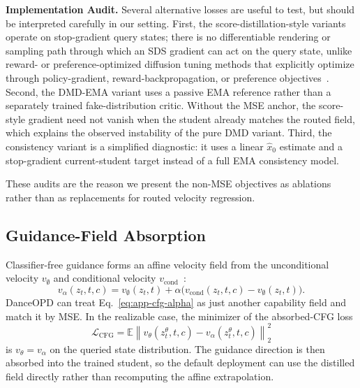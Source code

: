 \documentclass{llmxive}
\begin{document}
\noindent\textbf{Implementation Audit.}
Several alternative losses are useful to test, but should be interpreted carefully in our setting. First, the score-distillation-style variants operate on stop-gradient query states; there is no differentiable rendering or sampling path through which an SDS gradient can act on the query state, unlike reward- or preference-optimized diffusion tuning methods that explicitly optimize through policy-gradient, reward-backpropagation, or preference objectives~\cite{black2024training,fan2023dpok,prabhudesai2023aligning,wallace2024diffusion}. Second, the DMD-EMA variant uses a passive EMA reference rather than a separately trained fake-distribution critic. Without the MSE anchor, the score-style gradient need not vanish when the student already matches the routed field, which explains the observed instability of the pure DMD variant. Third, the consistency variant is a simplified diagnostic: it uses a linear $\hat{x}_0$ estimate and a stop-gradient current-student target instead of a full EMA consistency model. 

These audits are the reason we present the non-MSE objectives as ablations rather than as replacements for routed velocity regression.


\vspace{0.2cm}


\subsection{Guidance-Field Absorption}
\label{app:cfg-absorption}

Classifier-free guidance forms an affine velocity field from the unconditional velocity $v_{\emptyset}$ and conditional velocity $v_{\mathrm{cond}}$~\cite{ho2022classifier}:
\begin{equation}
  v_{\alpha}(z_t,t,c)
  =
  v_{\emptyset}(z_t,t)
  +\alpha\bigl(v_{\mathrm{cond}}(z_t,t,c)-v_{\emptyset}(z_t,t)\bigr).
  \label{eq:app-cfg-alpha}
\end{equation}
DanceOPD can treat Eq.~\eqref{eq:app-cfg-alpha} as just another capability field and match it by MSE. In the realizable case, the minimizer of the absorbed-CFG loss
\begin{equation}
  \mathcal{L}_{\mathrm{CFG}}
  =\mathbb{E}\left\|v_\theta(z_t^\theta,t,c)-v_{\alpha}(z_t^\theta,t,c)\right\|_2^2
  \label{eq:app-cfg-mse}
\end{equation}
is $v_\theta=v_{\alpha}$ on the queried state distribution. The guidance direction is then absorbed into the trained student, so the default deployment can use the distilled field directly rather than recomputing the affine extrapolation.
\end{document}
